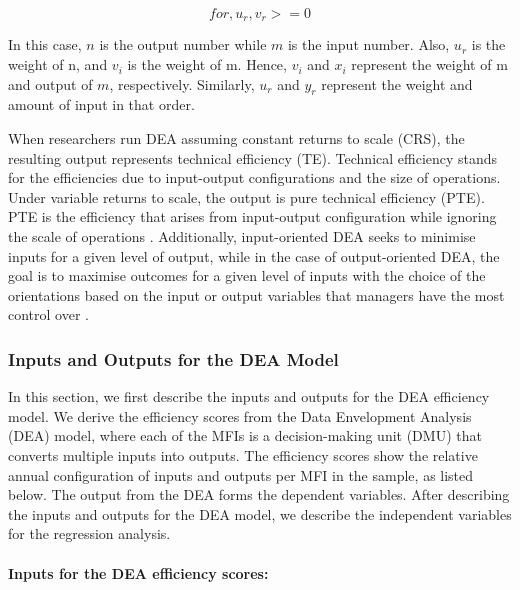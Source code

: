 \documentclass[a4paper, nobind]{templates/ociamthesis}
\begin{document}
\begin{equation}
for, u_{r}, v_{r} >= 0
\end{equation}

In this case, \(n\) is the output number while \(m\) is the input number. Also, \(u_{r}\) is the weight of n, and \(v_{i}\) is the weight of m. Hence, \(v_{i}\) and \(x_{i}\) represent the weight of m and output of \(m\), respectively. Similarly, \(u_{r}\) and \(y_{r}\) represent the weight and amount of input in that order.

When researchers run DEA assuming constant returns to scale (CRS), the resulting output represents technical efficiency (TE). Technical efficiency stands for the efficiencies due to input-output configurations and the size of operations. Under variable returns to scale, the output is pure technical efficiency (PTE). PTE is the efficiency that arises from input-output configuration while ignoring the scale of operations \autocite{staub2010evolution,ulas2015performance}. Additionally, input-oriented DEA seeks to minimise inputs for a given level of output, while in the case of output-oriented DEA, the goal is to maximise outcomes for a given level of inputs with the choice of the orientations based on the input or output variables that managers have the most control over \autocite{huguenin2012data}.

\hypertarget{inputs-and-outputs-for-the-dea-model}{%
\subsubsection{Inputs and Outputs for the DEA Model}\label{inputs-and-outputs-for-the-dea-model}}

In this section, we first describe the inputs and outputs for the DEA efficiency model. We derive the efficiency scores from the Data Envelopment Analysis (DEA) model, where each of the MFIs is a decision-making unit (DMU) that converts multiple inputs into outputs. The efficiency scores show the relative annual configuration of inputs and outputs per MFI in the sample, as listed below. The output from the DEA forms the dependent variables. After describing the inputs and outputs for the DEA model, we describe the independent variables for the regression analysis.

\hypertarget{inputs-for-the-dea-efficiency-scores}{%
\paragraph{Inputs for the DEA efficiency scores:}\label{inputs-for-the-dea-efficiency-scores}}
\end{document}
